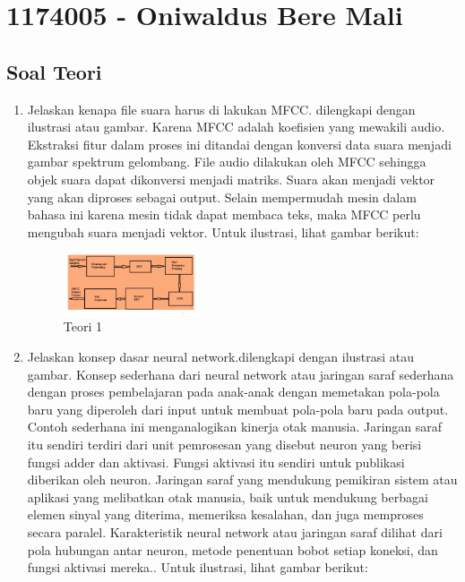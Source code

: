 \section{1174005 - Oniwaldus Bere Mali}
\subsection{Soal Teori}
\begin{enumerate}

	\item Jelaskan kenapa file suara harus di lakukan MFCC. dilengkapi dengan ilustrasi atau gambar.
	\hfill\break
	Karena MFCC adalah koefisien yang mewakili audio. Ekstraksi fitur dalam proses ini ditandai dengan konversi data suara menjadi gambar spektrum gelombang. File audio dilakukan oleh MFCC sehingga objek suara dapat dikonversi menjadi matriks. Suara akan menjadi vektor yang akan diproses sebagai output. Selain mempermudah mesin dalam bahasa ini karena mesin tidak dapat membaca teks, maka MFCC perlu mengubah suara menjadi vektor. Untuk ilustrasi, lihat gambar berikut: 

	\begin{figure}[H]
	\centering
		\includegraphics[width=4cm]{figures/1174005/tugas6/materi/teori1.PNG}
		\caption{Teori 1}
	\end{figure}

	\item Jelaskan konsep dasar neural network.dilengkapi dengan ilustrasi atau gambar.
	\hfill\break
	Konsep sederhana dari neural network atau jaringan saraf sederhana dengan proses pembelajaran pada anak-anak dengan memetakan pola-pola baru yang diperoleh dari input untuk membuat pola-pola baru pada output. Contoh sederhana ini menganalogikan kinerja otak manusia. Jaringan saraf itu sendiri terdiri dari unit pemrosesan yang disebut neuron yang berisi fungsi adder dan aktivasi. Fungsi aktivasi itu sendiri untuk publikasi diberikan oleh neuron. Jaringan saraf yang mendukung pemikiran sistem atau aplikasi yang melibatkan otak manusia, baik untuk mendukung berbagai elemen sinyal yang diterima, memeriksa kesalahan, dan juga memproses secara paralel. Karakteristik neural network atau jaringan saraf dilihat dari pola hubungan antar neuron, metode penentuan bobot setiap koneksi, dan fungsi aktivasi mereka.. Untuk ilustrasi, lihat gambar berikut: 


\end{enumerate}
